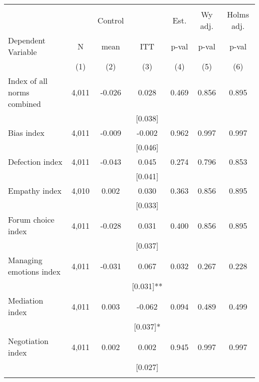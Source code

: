 \begin{tabular}{lcccccc}
\hline \noalign{\smallskip} &  &  &  &  &  & \\
 &  & Control &  & Est. & Wy adj. & Holms adj.\\
Dependent Variable & N & mean & ITT & p-val & p-val & p-val\\
 & (1) & (2) & (3) & (4) & (5) & (6)\\
\noalign{\smallskip}\hline \noalign{\smallskip}Index of all norms combined & 4,011 & -0.026 & 0.028 & 0.469 & 0.856 & 0.895\\
 &  &  & [0.038] &  &  & \\
\quad Bias index & 4,011 & -0.009 & -0.002 & 0.962 & 0.997 & 0.997\\
 &  &  & [0.046] &  &  & \\
\quad Defection index & 4,011 & -0.043 & 0.045 & 0.274 & 0.796 & 0.853\\
 &  &  & [0.041] &  &  & \\
\quad Empathy index & 4,010 & 0.002 & 0.030 & 0.363 & 0.856 & 0.895\\
 &  &  & [0.033] &  &  & \\
\quad Forum choice index & 4,011 & -0.028 & 0.031 & 0.400 & 0.856 & 0.895\\
 &  &  & [0.037] &  &  & \\
\quad Managing emotions index & 4,011 & -0.031 & 0.067 & 0.032 & 0.267 & 0.228\\
 &  &  & [0.031]** &  &  & \\
\quad Mediation index & 4,011 & 0.003 & -0.062 & 0.094 & 0.489 & 0.499\\
 &  &  & [0.037]* &  &  & \\
\quad Negotiation index & 4,011 & 0.002 & 0.002 & 0.945 & 0.997 & 0.997\\
 &  &  & [0.027] &  &  & \\
\noalign{\smallskip}\hline\end{tabular}
